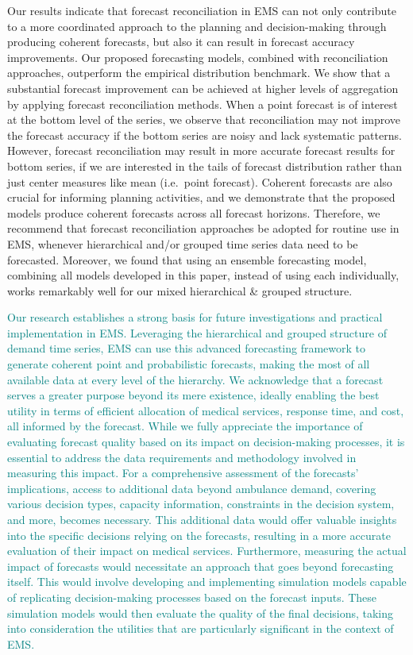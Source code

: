 \documentclass[
  authoryear,
  preprint,
  3p]{elsarticle}
\begin{document}
Our results indicate that forecast reconciliation in EMS can not only
contribute to a more coordinated approach to the planning and
decision-making through producing coherent forecasts, but also it can
result in forecast accuracy improvements. Our proposed forecasting
models, combined with reconciliation approaches, outperform the
empirical distribution benchmark. We show that a substantial forecast
improvement can be achieved at higher levels of aggregation by applying
forecast reconciliation methods. When a point forecast is of interest at
the bottom level of the series, we observe that reconciliation may not
improve the forecast accuracy if the bottom series are noisy and lack
systematic patterns. However, forecast reconciliation may result in more
accurate forecast results for bottom series, if we are interested in the
tails of forecast distribution rather than just center measures like
mean (i.e.~point forecast). Coherent forecasts are also crucial for
informing planning activities, and we demonstrate that the proposed
models produce coherent forecasts across all forecast horizons.
Therefore, we recommend that forecast reconciliation approaches be
adopted for routine use in EMS, whenever hierarchical and/or grouped
time series data need to be forecasted. Moreover, we found that using an
ensemble forecasting model, combining all models developed in this
paper, instead of using each individually, works remarkably well for our
mixed hierarchical \& grouped structure.

\textcolor{teal}{Our research establishes a strong basis for future investigations and practical implementation in EMS. Leveraging the hierarchical and grouped structure of demand time series, EMS can use this advanced forecasting framework to generate coherent point and probabilistic forecasts, making the most of all available data at every level of the hierarchy. We acknowledge that a forecast serves a greater purpose beyond its mere existence, ideally enabling the best utility in terms of efficient allocation of medical services, response time, and cost, all informed by the forecast. While we fully appreciate the importance of evaluating forecast quality based on its impact on decision-making processes, it is essential to address the data requirements and methodology involved in measuring this impact. For a comprehensive assessment of the forecasts' implications, access to additional data beyond ambulance demand, covering various decision types, capacity information, constraints in the decision system, and more, becomes necessary. This additional data would offer valuable insights into the specific decisions relying on the forecasts, resulting in a more accurate evaluation of their impact on medical services. Furthermore, measuring the actual impact of forecasts would necessitate an approach that goes beyond forecasting itself. This would involve developing and implementing simulation models capable of replicating decision-making processes based on the forecast inputs. These simulation models would then evaluate the quality of the final decisions, taking into consideration the utilities that are particularly significant in the context of EMS.}
\end{document}
